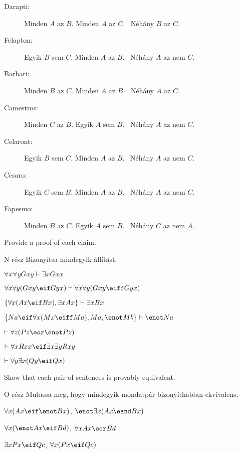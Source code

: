 \begin{description}
\item[Darapti:] Minden $A$ az $B$. Minden $A$ az $C$.
	\therefore\  Néhány $B$ az $C$.
\item[Felapton:] Egyik $B$ sem $C$. Minden $A$ az $B$.
	\therefore\  Néhány $A$ az nem $C$.
\item[Barbari:] Minden $B$ az $C$. Minden $A$ az $B$.
	\therefore\  Néhány $A$ az $C$.
\item[Camestros:] Minden $C$ az $B$. Egyik $A$ sem $B$.
	\therefore\  Néhány $A$ az nem $C$.
\item[Celaront:] Egyik $B$ sem $C$. Minden $A$ az $B$.
	\therefore\  Néhány $A$ az nem $C$.
\item[Cesaro:] Egyik $C$ sem $B$. Minden $A$ az $B$.
	\therefore\  Néhány $A$ az nem $C$.
\item[Fapesmo:] Minden $B$ az $C$. Egyik $A$ sem $B$.
	\therefore\  Néhány $C$ az nem $A$.
\end{description}


\problempart
Provide a proof of each claim.

N rész Bizonyítsa mindegyik állítást.

\begin{earg}
\item $\forall x \forall y Gxy\vdash\exists x Gxx$
\item $\forall x \forall y (Gxy \eif Gyx) \vdash \forall x\forall y (Gxy \eiff Gyx)$
\item $\{\forall x(Ax\eif Bx), \exists x Ax\} \vdash \exists x Bx$
\item $\{Na \eif \forall x(Mx \eiff Ma), Ma, \enot Mb\}\vdash \enot Na$
\item $\vdash\forall z (Pz \eor \enot Pz)$
\item $\vdash\forall x Rxx\eif \exists x \exists y Rxy$
\item $\vdash\forall y \exists x (Qy \eif Qx)$
\end{earg}



\problempart
Show that each pair of sentences is provably equivalent.

O rész Mutassa meg, hogy mindegyik mondatpár bizonyíthatóan ekvivalens.

\begin{earg}
\item $\forall x (Ax\eif \enot Bx)$, $\enot\exists x(Ax \eand Bx)$
\item $\forall x (\enot Ax\eif Bd)$, $\forall x Ax \eor Bd$
\item $\exists x Px \eif Qc$, $\forall x (Px \eif Qc)$
\end{earg}



